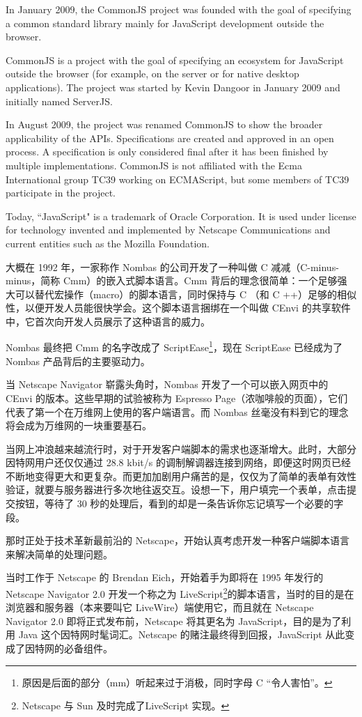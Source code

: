 In January 2009, the CommonJS project was founded with the goal of specifying a common standard library mainly for JavaScript development outside the browser.

CommonJS is a project with the goal of specifying an ecosystem for JavaScript outside the browser (for example, on the server or for native desktop applications). The project was started by Kevin Dangoor in January 2009 and initially named ServerJS.

In August 2009, the project was renamed CommonJS to show the broader applicability of the APIs. Specifications are created and approved in an open process. A specification is only considered final after it has been finished by multiple implementations. CommonJS is not affiliated with the Ecma International group TC39 working on ECMAScript, but some members of TC39 participate in the project.

Today, ``JavaScript" is a trademark of Oracle Corporation. It is used under license for technology invented and implemented by Netscape Communications and current entities such as the Mozilla Foundation.

大概在 1992 年，一家称作 Nombas 的公司开发了一种叫做 C 减减（C-minus-minus，简称 Cmm）的嵌入式脚本语言。Cmm 背后的理念很简单：一个足够强大可以替代宏操作（macro）的脚本语言，同时保持与 C （和 C ++）足够的相似性，以便开发人员能很快学会。这个脚本语言捆绑在一个叫做 CEnvi 的共享软件中，它首次向开发人员展示了这种语言的威力。

Nombas 最终把 Cmm 的名字改成了 ScriptEase\footnote{原因是后面的部分（mm）听起来过于消极，同时字母 C “令人害怕”。}，现在 ScriptEase 已经成为了 Nombas 产品背后的主要驱动力。

当 Netscape Navigator 崭露头角时，Nombas 开发了一个可以嵌入网页中的 CEnvi 的版本。这些早期的试验被称为 Espresso Page（浓咖啡般的页面），它们代表了第一个在万维网上使用的客户端语言。而 Nombas 丝毫没有料到它的理念将会成为万维网的一块重要基石。

当网上冲浪越来越流行时，对于开发客户端脚本的需求也逐渐增大。此时，大部分因特网用户还仅仅通过 28.8 kbit/s 的调制解调器连接到网络，即便这时网页已经不断地变得更大和更复杂。而更加加剧用户痛苦的是，仅仅为了简单的表单有效性验证，就要与服务器进行多次地往返交互。设想一下，用户填完一个表单，点击提交按钮，等待了 30 秒的处理后，看到的却是一条告诉你忘记填写一个必要的字段。

那时正处于技术革新最前沿的 Netscape，开始认真考虑开发一种客户端脚本语言来解决简单的处理问题。

当时工作于 Netscape 的 Brendan Eich，开始着手为即将在 1995 年发行的 Netscape Navigator 2.0 开发一个称之为 LiveScript\footnote{Netscape 与 Sun 及时完成了LiveScript 实现。}的脚本语言，当时的目的是在浏览器和服务器（本来要叫它 LiveWire）端使用它，而且就在 Netscape Navigator 2.0 即将正式发布前，Netscape 将其更名为 JavaScript，目的是为了利用 Java 这个因特网时髦词汇。Netscape 的赌注最终得到回报，JavaScript 从此变成了因特网的必备组件。

